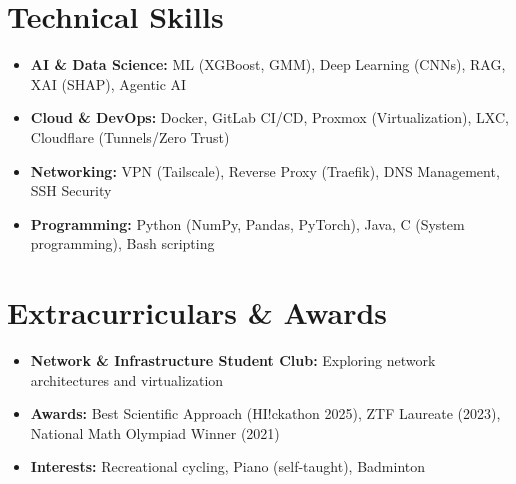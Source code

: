\documentclass[11pt,a4paper]{moderncv}
\begin{document}

\section{Technical Skills}

\begin{itemize}[leftmargin=.2in]
\setlength\itemsep{.2em}

\item \textbf{AI \& Data Science:} ML (XGBoost, GMM), Deep Learning (CNNs), RAG, XAI (SHAP), Agentic AI
\item \textbf{Cloud \& DevOps:} Docker, GitLab CI/CD, Proxmox (Virtualization), LXC, Cloudflare (Tunnels/Zero Trust)
\item \textbf{Networking:} VPN (Tailscale), Reverse Proxy (Traefik), DNS Management, SSH Security
\item \textbf{Programming:} Python (NumPy, Pandas, PyTorch), Java, C (System programming), Bash scripting
\end{itemize}


\section{Extracurriculars \& Awards}

\begin{itemize}[leftmargin=.2in]
\item \textbf{Network \& Infrastructure Student Club:} Exploring network architectures and virtualization
\item \textbf{Awards:} Best Scientific Approach (HI!ckathon 2025), ZTF Laureate (2023), National Math Olympiad Winner (2021)
\item \textbf{Interests:} Recreational cycling, Piano (self-taught), Badminton
\end{itemize}
\end{document}
